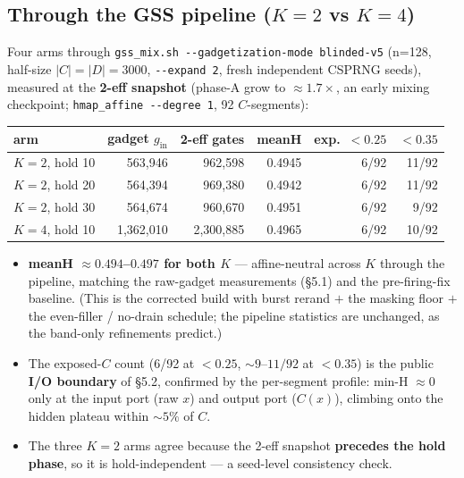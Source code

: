 \documentclass[11pt]{article}
\newcommand{\doc}[1]{\texttt{#1}}
\begin{document}
\subsection{Through the GSS pipeline ($K=2$ vs $K=4$)}

Four arms through \doc{gss\_mix.sh -{}-gadgetization-mode blinded-v5} (n=128,
half-size $|C|=|D|=3000$, \doc{-{}-expand 2}, fresh independent CSPRNG seeds),
measured at the \textbf{2-eff snapshot} (phase-A grow to ${\approx}1.7\times$, an
early mixing checkpoint; \doc{hmap\_affine -{}-degree 1}, 92 $C$-segments):

\begin{table}[H]\centering
\begin{tabular}{@{}lrrrrr@{}}
\toprule
arm & gadget $g_\mathrm{in}$ & 2-eff gates & meanH & exp.\ $<0.25$ & $<0.35$ \\
\midrule
$K{=}2$, hold 10 & 563{,}946 & 962{,}598 & 0.4945 & 6/92 & 11/92 \\
$K{=}2$, hold 20 & 564{,}394 & 969{,}380 & 0.4942 & 6/92 & 11/92 \\
$K{=}2$, hold 30 & 564{,}674 & 960{,}670 & 0.4951 & 6/92 & 9/92 \\
$K{=}4$, hold 10 & 1{,}362{,}010 & 2{,}300{,}885 & 0.4965 & 6/92 & 10/92 \\
\bottomrule
\end{tabular}
\end{table}

\begin{itemize}
\item \textbf{meanH ${\approx}0.494$--$0.497$ for both $K$} --- affine-neutral
  across $K$ through the pipeline, matching the raw-gadget measurements
  (\S5.1) and the pre-firing-fix baseline. (This is the corrected build with
  burst rerand $+$ the masking floor $+$ the even-filler / no-drain schedule; the
  pipeline statistics are unchanged, as the band-only refinements predict.)
\item The exposed-$C$ count (6/92 at $<0.25$, ${\sim}9$--$11/92$ at $<0.35$) is
  the public \textbf{I/O boundary} of \S5.2, confirmed by the per-segment
  profile: min-H ${\approx}0$ only at the input port (raw $x$) and output port
  ($C(x)$), climbing onto the hidden plateau within ${\sim}5\%$ of $C$.
\item The three $K{=}2$ arms agree because the 2-eff snapshot \textbf{precedes the
  hold phase}, so it is hold-independent --- a seed-level consistency check.
\end{itemize}
\end{document}
